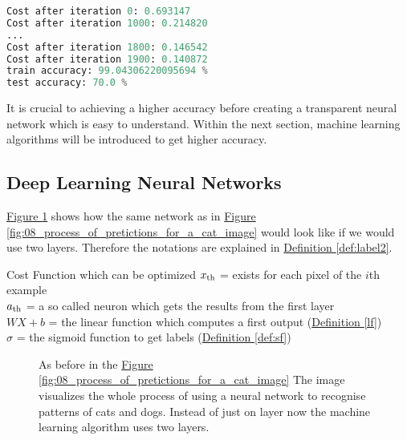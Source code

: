 \begin{lstlisting}[captionpos=b,label={lst:acc},language=Python, caption=Test accuracy is 70\% after iteration 2000 times and using 209 examples with 12287 features (\(64\times64 \) pixels). This is not state of the art but very good if considering that this is a linear classifier on a high dimensional feature space.]
Cost after iteration 0: 0.693147
Cost after iteration 1000: 0.214820
...
Cost after iteration 1800: 0.146542
Cost after iteration 1900: 0.140872
train accuracy: 99.04306220095694 %
test accuracy: 70.0 %
\end{lstlisting}

It is crucial to achieving a higher accuracy before creating a transparent neural network which is easy to understand. Within the next section, machine learning algorithms will be introduced to get higher accuracy.

\subsection{Deep Learning Neural Networks}
\label{subsec:deep_learning}
\hyperref[fig:10_process_of_pretictions_for_a_cat_image_two_layers]{Figure \ref{fig:10_process_of_pretictions_for_a_cat_image_two_layers}} shows how the same network as in \hyperref[fig:08_process_of_pretictions_for_a_cat_image]{Figure \ref{fig:08_process_of_pretictions_for_a_cat_image}} would look like if we would use two layers. Therefore the notations are explained in 
\hyperref[def:label2]{Definition \ref{def:label2}}.
\begin{definition}[label=def:label2]{Cost Function which can be optimized}
	\(x\textsubscript{th} \) = exists for each pixel of the \(i\)th example \\
	\(a\textsubscript{th} \) = a so called neuron which gets the results from the first layer \\
	\( WX+b\) = the linear function which computes a first output (\hyperref[lf]{Definition \ref{lf}}) \\
	\( \sigma \) = the sigmoid function to get labels  (\hyperref[def:sf]{Definition \ref{def:sf}})
\end{definition}

\begin{figure}[htp]
	\centering
	\caption{As before in the \hyperref[fig:08_process_of_pretictions_for_a_cat_image]{Figure \ref{fig:08_process_of_pretictions_for_a_cat_image}} The image visualizes the whole process of using a neural network to recognise patterns of cats and dogs. Instead of just on layer now the machine learning algorithm uses two layers.}
	\label{fig:10_process_of_pretictions_for_a_cat_image_two_layers}
\end{figure}

